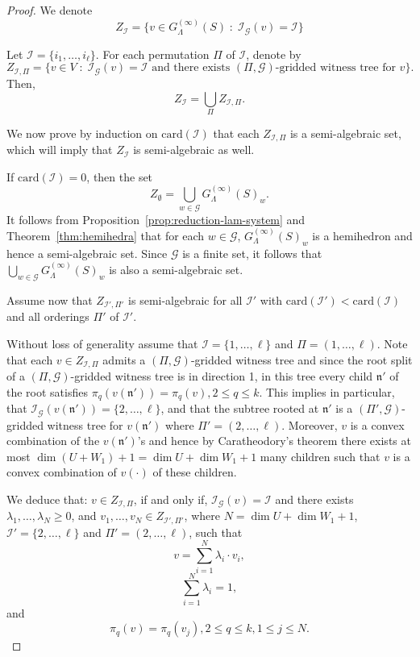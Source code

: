 \documentclass[10pt]{amsart}
\theoremstyle{plain}
\theoremstyle{definition}
\providecommand{\cG}[0]{\ensuremath{\mathcal G}\xspace}
\providecommand{\cI}[0]{\ensuremath{\mathcal I}\xspace}
\let\leq\leqslant
\let\geq\geqslant
\providecommand{\card}[0]{\ensuremath{\mathrm{card}}\xspace}
\begin{document}
\begin{proof}
    We denote 
    \[
    Z_{\cI} = \{v \in G^{(\infty)}_\Lambda(S) \;:\; \cI_\cG(v) = \cI \}
    \]
    
 
Let $\cI = \{i_1,\ldots,i_\ell\}$. 
For each permutation $\Pi$ of $\cI$, denote by 
\[
Z_{\cI,\Pi} = 
\{v \in V \; : \; \cI_\cG(v) = \cI \text{ and there exists $(\Pi,\cG)$-gridded witness tree for $v$}\}.
\]
Then, 
\[
Z_{\cI} = \bigcup_{\Pi} Z_{\cI,\Pi}.
\]

We now prove by induction on $\card(\cI)$ that each $Z_{\cI,\Pi}$ is a semi-algebraic set, which will
imply that $Z_{\cI}$ is semi-algebraic as well.

If $\card(\cI)= 0$, then
    the set 
    \[
Z_{\emptyset} = \bigcup_{w \in \cG} G^{(\infty)}_\Lambda(S)_w.
\] 
 It follows from Proposition~\ref{prop:reduction-lam-system} and Theorem~\ref{thm:hemihedra} that for each $w \in \cG$,
 $G^{(\infty)}_\Lambda(S)_w$ is a hemihedron and hence a semi-algebraic set.
 Since $\cG$ is a finite set, it follows that
 $\bigcup_{w \in \cG} G^{(\infty)}_\Lambda(S)_w$ is also a semi-algebraic set.

Assume now that $Z_{\cI',\Pi'}$ is semi-algebraic for all $\cI'$ with 
$\card(\cI') < \card(\cI)$ and all orderings $\Pi'$ of $\cI'$.

Without loss of generality assume that $\cI = \{1,\ldots,\ell\}$ and 
$\Pi = (1,\ldots,\ell)$. Note that each $v \in Z_{\cI,\Pi}$
admits a $(\Pi,\cG)$-gridded witness tree and 
since the root split of a $(\Pi,\cG)$-gridded witness tree is in direction 1, in this tree every child $\mathfrak{n}'$ of the root satisfies 
$\pi_q(v(\mathfrak{n}')) = \pi_q(v), 2 \leq q \leq k$. This implies in particular, that $\cI_\cG(v(\mathfrak{n}')) = \{2,\ldots,\ell\}$, and
that the subtree rooted at $\mathfrak{n}'$ is a $(\Pi',\cG)$-gridded witness tree for $v(\mathfrak{n}')$ where $\Pi' = (2,\ldots,\ell)$. 
Moreover, $v$ is a convex combination of the $v(\mathfrak{n}')$'s and hence
by Caratheodory's theorem there exists at most $\dim(U+W_1) +1 = \dim U + \dim W_1 +1$ many children such that $v$ is a convex combination of 
$v(\cdot)$ of these children.

We deduce that: 
$v \in Z_{\cI,\Pi}$, if and only if,  $\cI_\cG(v) = \cI$ and there exists $\lambda_1,\ldots,\lambda_N \geq 0$,
and $v_1,\ldots, v_N \in Z_{\cI',\Pi'}$,
where $N = \dim U + \dim W_1 +1$,
$\cI' = \{2,\ldots,\ell\}$ and $ \Pi'=(2,\ldots,\ell)$,
such that
\[
v = \sum_{i=1}^{N} \lambda_i  \cdot v_i,
\]
\[
\sum_{i=1}^N \lambda_i  = 1,
\]
and 
\[
\pi_q(v) = \pi_q(v_j), 2 \leq q \leq k, 1 \leq j \leq N.
\]


\end{proof}
\end{document}
